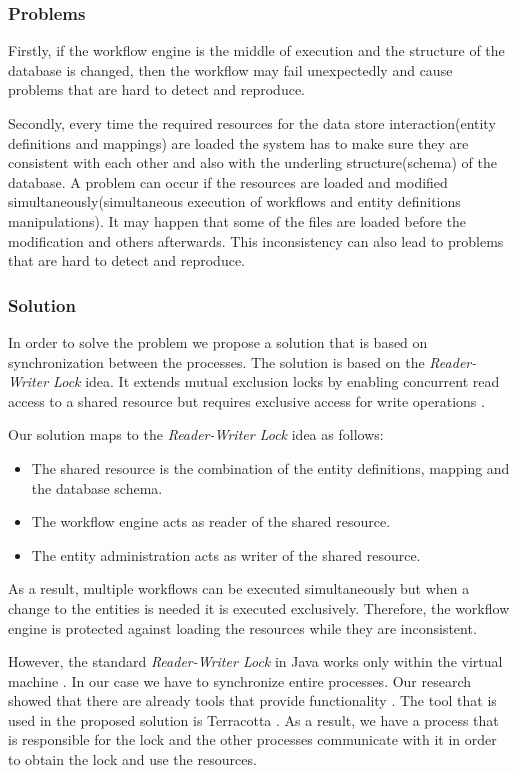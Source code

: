 \documentclass[a4paper, notitlepage]{article}
\begin{document}
\subsubsection{Problems}
Firstly, if the workflow engine is the middle of execution and the structure of the database is changed, then the workflow may fail unexpectedly and cause problems that are hard to detect and reproduce. 

Secondly, every time the required resources for the data store interaction(entity definitions and mappings) are loaded the system has to make sure they are consistent with each other and also with the underling structure(schema) of the database. A problem can occur if the resources are loaded and modified simultaneously(simultaneous execution of workflows and entity definitions manipulations). It may happen that some of the files are loaded before the modification and others afterwards. This inconsistency can also lead to problems that are hard to detect and reproduce.

\subsubsection{Solution}

In order to solve the problem we propose a solution that is based on synchronization between the processes. The solution is based on the \textit{Reader-Writer Lock} idea. It extends mutual exclusion locks by enabling concurrent read access to a shared resource but requires exclusive access for write operations \cite{Lev}.

Our solution maps to the \textit{Reader-Writer Lock} idea as follows:
\begin{itemize}
	\item The shared resource is the combination of the entity definitions, mapping and the database schema.
	\item The workflow engine acts as reader of the shared resource.
	\item The entity administration acts as writer of the shared resource.
\end{itemize}
As a result, multiple workflows can be executed simultaneously but when a change to the entities is needed it is executed exclusively. Therefore, the workflow engine is protected against loading the resources while they are inconsistent.

However, the standard \textit{Reader-Writer Lock} in Java works only within the virtual machine \cite{javadocs}. In our case we have to synchronize entire processes. Our research showed that there are already tools that provide functionality \cite{Hernane}. The tool that is used in the proposed solution is Terracotta \cite{terracotta}. As a result, we have a process that is responsible for the lock and the other processes communicate with it in order to obtain the lock and use the resources.
\end{document}
